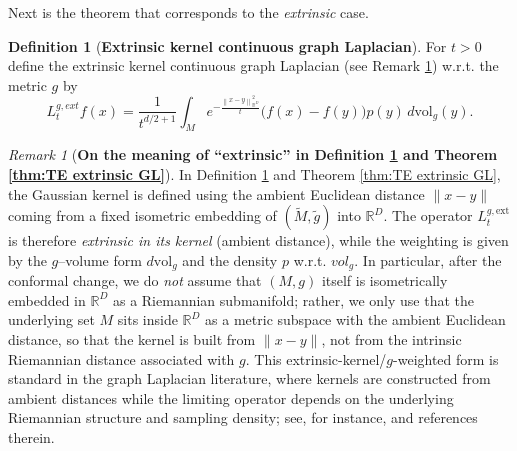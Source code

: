 \documentclass{amsart}
\let\oldcitet\citet
\renewcommand{\citet}[1]{\textcolor{blue}{\oldcitet{#1}}}
\theoremstyle{definition}
\newtheorem{definition}[theorem]{Definition}
\theoremstyle{remark}
\newtheorem{remark}[theorem]{Remark}
\newcommand{\nd}{\noindent}
\newcommand{\norm}[1]{\left\lVert#1\right\rVert}
\newcommand{\Ddim}{\mathbb{R}^D}
\newcommand{\0}{\boldsymbol{0}}
\begin{document}
\nd Next is the theorem that corresponds to the \textit{extrinsic} case. 

\begin{definition}[\textbf{Extrinsic kernel continuous graph Laplacian}]\label{def:ext-kernel-GL}
    \nd For $t>0$ define the extrinsic kernel continuous graph Laplacian (see Remark \ref{rmk:clarification-extrinsic}) w.r.t. the metric $g$ by
\[
L_t^{g, ext} f(x)
= \frac{1}{t^{d/2+1}}
  \int_M e^{-\frac{\norm{x-y}^2_{\Ddim}}{t}}\bigl(f(x)-f(y)\bigr)p(y)\,d\mathrm{vol}_g(y).
\]
\end{definition}

\begin{remark}[\textbf{On the meaning of ``extrinsic'' in Definition \ref{def:ext-kernel-GL} and Theorem \ref{thm:TE extrinsic GL}}]\label{rmk:clarification-extrinsic}
In Definition \ref{def:ext-kernel-GL} and Theorem \ref{thm:TE extrinsic GL}, the Gaussian kernel is defined using the ambient Euclidean distance
$\|x-y\|$ coming from a fixed isometric embedding of $(\tilde M,\tilde g)$ into
$\mathbb{R}^D$. The operator $L^{g,\mathrm{ext}}_t$ is therefore \emph{extrinsic in its
kernel} (ambient distance), while the weighting is given by the $g$--volume form
$d\mathrm{vol}_g$ and the density $p$ w.r.t. $vol_g$. In particular, after the conformal change, we do \emph{not} assume that $(M,g)$ itself is isometrically embedded in $\mathbb{R}^D$ as a Riemannian submanifold; rather, we only use that the underlying set $M$ sits inside $\mathbb{R}^D$ as a metric subspace with the ambient Euclidean distance, so that the kernel is built from $\|x-y\|$, not from the intrinsic Riemannian distance associated with $g$. This extrinsic-kernel/$g$-weighted form is standard in the graph Laplacian literature, where kernels are
constructed from ambient distances while the limiting operator depends on the
underlying Riemannian structure and sampling density; see, for instance,
\citet{BelkinNiyogi2008, HeinAudibertLuxburgJMLR2007} and references therein.
\end{remark}
\end{document}
